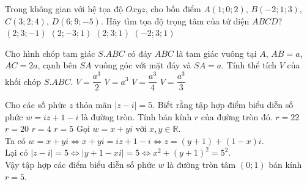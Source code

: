 	\begin{ex}%
		Trong không gian với hệ tọa độ $Oxyz$, cho bốn điểm $A\left(1;0;2\right)$, $B\left(-2; 1; 3\right)$, $C\left(3; 2; 4\right)$, $D\left(6; 9; -5\right)$. Hãy tìm tọa độ trọng tâm của tứ diện $ABCD$?
		\choice
		{$\left(2; 3; -1\right)$}
		{$\left(2; -3; 1\right)$}
		{\True $\left(2; 3; 1\right)$}
		{$\left(-2; 3; 1\right)$}
	\end{ex}
	\begin{ex}%
		Cho hình chóp tam giác $S.ABC$ có đáy $ABC$ là tam giác vuông tại $A$, $AB=a$, $AC=2a$, cạnh bên $SA$ vuông góc với mặt đáy và $SA=a$. Tính thể tích $V$ của khối chóp $S.ABC$.
		\choice
		{$V=\dfrac{a^3}{2}$}
		{$V=a^3$}
		{$V=\dfrac{a^3}{4}$}
		{\True $V=\dfrac{a^3}{3}$}
	\end{ex}

\begin{ex}%
 Cho các số phức $z$ thỏa mãn $| z - i | = 5$. Biết rằng tập hợp điểm biểu diễn số phức $w = iz + 1 - i$  là đường tròn. Tính bán kính $r$ của đường tròn đó.
 \choice
  {$r = 22$}
  {$r = 20$}
  {$r = 4$}
  {\True $r = 5$}
 \loigiai
  {
  Gọi $w = x + yi$ với $x,y \in \mathbb{R}$.\\
  Ta có $w = x + yi \Leftrightarrow x + yi = iz + 1 - i \Leftrightarrow z = (y + 1) + (1 - x)i$.\\
  Lại có $| z - i | = 5 \Leftrightarrow | y + 1 - xi | = 5 \Leftrightarrow x^2 + (y + 1)^2 = 5^2$.\\
  Vậy tập hợp các điểm biểu diễn số phức $w$ là đường tròn tâm $(0;1)$ bán kính $r = 5$.
  }
\end{ex}

